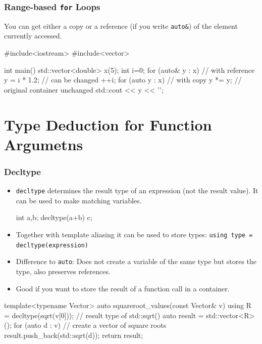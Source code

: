 \documentclass[aspectratio=169,ignorenonframetext,11pt]{beamer}
\def\inline{\lstinline[basicstyle=\small\ttfamily]}
\begin{document}
\begin{frame}[fragile]
  \frametitle<presentation>{Range-based \texttt{for} Loops}

  You can get either a copy or a reference (if you write \inline!auto&!) of the element currently accessed.

\begin{cppcode}
#include<iostream>
#include<vector>

int main() {
  std::vector<double> x(5);
  int i=0;
  for (auto& y : x) {       // with reference
    y = i * 1.2;            // can be changed
    ++i;
  }
  for (auto y : x) {        // with copy
    y *= y;                 // original container unchanged
    std::cout << y << '\n';
  }
}
\end{cppcode}

\end{frame}

\section{Type Deduction for Function Argumetns}

\begin{frame}[fragile]
  \frametitle{Decltype}
\begin{itemize}
\item \lstinline!decltype! determines the result type of an expression (not the result value). It can be used to make matching variables.
\small
  \begin{cppcode}
int a,b;
decltype(a+b) c;
\end{cppcode}
\item Together with template aliasing it can 
be used to store types:
\inline!using type = decltype(expression)! 
\item Difference to \inline!auto!: Does not create a variable of the same type but stores the type, also preserves references.
\item Good if you want to store the result of a function call in a container.
\end{itemize}
\small
\begin{cppcode}
template<typename Vector>
auto squareroot_values(const Vector& v) {
  using R = decltype(sqrt(v[0])); // result type of std::sqrt()
  auto result = std::vector<R>();
  for (auto d : v)                // create a vector of square roots
    result.push_back(std::sqrt(d)); 
  return result;
}
\end{cppcode}
\end{frame}
\end{document}
